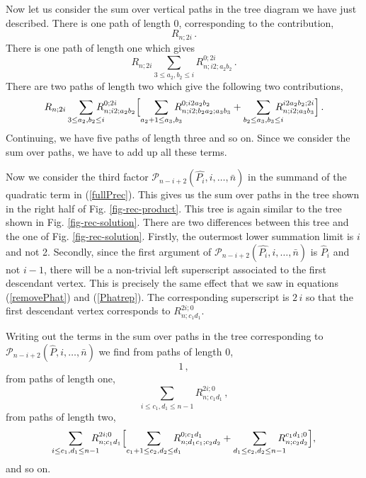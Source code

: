 \documentclass[12pt]{article}
\def \be  {\begin{equation}}
\def \ee  {\end{equation}}
\begin{document}
{Now let us consider the sum over vertical paths in the tree diagram we have just described. There is one path of length 0, corresponding to the contribution,
\be
R_{n;2i}\,.
\label{left0}
\ee
There is one path of length one which gives
\be
R_{n;2i} \sum_{3\leq a_2,b_2 \leq i} \!\!\!\!\!\! R_{n;i2;a_2b_2}^{0;2i} \, .
\label{left1}
\ee
There are two paths of length two which give the following two contributions,
\be
R_{n;2i} \sum_{3\leq a_2,b_2 \leq i} \!\!\!\!\!\! R_{n;i2;a_2b_2}^{0;2i} \Bigl[\sum_{a_2+1 \leq a_3,b_3} \!\!\!\!\!\! R_{n;i2;b_2a_2;a_3b_3}^{0;i2a_2b_2} + \sum_{b_2 \leq a_3,b_3 \leq i} \!\!\!\!\!\! R_{n;i2;a_3b_3}^{i2a_2b_2;2i} \Bigr] \, .
\label{left2}
\ee
Continuing, we have five paths of length three and so on. Since we consider the sum over paths, we have to add up all these terms.

Now we consider the third factor $\mathcal{P}_{n-i+2}(\hat{P_i},i,\ldots,\bar{n})$ in the summand of the quadratic term in (\ref{fullPrec}). This gives us the sum over paths in the tree shown in the right half of Fig. \ref{fig-rec-product}. This tree is again similar to the tree shown in Fig. \ref{fig-rec-solution}. There are two differences between this tree and the one of Fig. \ref{fig-rec-solution}. Firstly, the outermost lower summation limit is $i$ and not 2. Secondly, since the first argument of $\mathcal{P}_{n-i+2}(\hat{P_i},i,\ldots,\bar{n})$ is $\hat{P}_i$ and not $i-1$, there will be a non-trivial left superscript associated to the first descendant vertex. This is precisely the same effect that we saw in equations (\ref{removePhat}) and (\ref{Phatrep}). The corresponding superscript is $2\,i$ so that the first descendant vertex corresponds to $R_{n;c_1d_1}^{2i;0}$.

Writing out the terms in the sum over paths in the tree corresponding to $\mathcal{P}_{n-i+2}(\hat{P},i,\ldots,\bar n)$ we find from paths of length 0,
\be
1\, ,
\label{right0}
\ee
from paths of length one,
\be
\sum_{i\leq c_1,d_1 \leq n-1} \!\!\!\!\!\! R_{n;c_1d_1}^{2i;0}\, ,
\label{right1}
\ee
from paths of length two,
\be
\sum_{i\leq c_1,d_1 \leq n-1} \!\!\!\!\!\! R_{n;c_1d_1}^{2i;0} \Bigl[ \sum_{c_1+1 \leq c_2,d_2 \leq d_1} \!\!\!\!\!\! R_{n;d_1c_1;c_2d_2}^{0;c_1d_1} + \sum_{d_1 \leq c_2,d_2 \leq n-1} \!\!\!\!\!\! R_{n;c_2d_2}^{c_1d_1;0} \Bigr],
\label{right2}
\ee
and so on.

}
\end{document}
